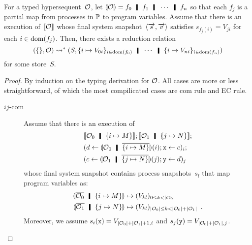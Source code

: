   \begin{proposition}
   \label{general-sound}
   For a typed hypersequent~$\mathcal{O}$, let $\semoi{\hypert} = f_0\hmid
   f_1\hmid\cdots \hmid f_n$ so that each $f_j$ is a partial map
   from processes in $\mathbb{P}$ to program variables.
   Assume that there is an execution of $\llbracket{\mathcal{O}}\rrbracket$ whose
   final system snapshot~$\langle{\overrightarrow s,\overrightarrow v}\rangle$ satisfies
   $s_{f_j(i)} = V_{ji}$ for each $i \in \mathop{\mathrm{dom}}(f_j)$.
   Then, there exists a reduction relation
   \[
   \concreteconf{\{\}}{\hypert}\reduction
   \concreteconf{S}{
   \{i\mapsto V_{0i}\}_{i\in\dom(f_0)}\hmid
   \cdots\hmid
   \{i\mapsto V_{ni}\}_{i\in\dom(f_n)}
   }
   \]
   for some store~$S$.
  \end{proposition}
   \begin{proof}
    By induction on the typing derivation for $\mathcal{O}$.
    All cases are more or less straightforward, of which the most
    compilicated cases are com rule and EC rule.
    \begin{description}
     \item[$ij$-com]
	  Assume that there is an execution of
	  \begin{align*}
	   &\semo{\hypert_0\hmid \imapsto{M}};
	   \semo{\hypert_1\hmid \jmapsto{N}};\\
	   &(d\leftarrow \semoi{\hypert_0\hmid\overline{\imapsto M}}(i); \p
	   x\leftarrow c)_i; \\
	   &(c\leftarrow \semoi{\hypert_1\hmid\overline{\jmapsto N}}(j); \p
	   y\leftarrow d)_j
	  \end{align*}
	  whose final system snapshot contains process snapshots~$s_l$
	  that map program variables as:
	  \begin{align*}
	   \semoi{\overline{\hypert_0}\hmid \imapsto{M}}&\mapsto
	   (V_{kl})_{0\le k < |\hypert_0|}\\
	   \semoi{\overline{\hypert_1}\hmid \jmapsto{N}}&\mapsto
	   (V_{kl})_{|\hypert_0|\le k < |\hypert_0| + |\hypert_1|}\enspace.
	  \end{align*}
	  Moreover, we assume $s_i(\texttt{x}) = V_{|\mathcal{O}_0|+|\mathcal{O}_1|+1,i}$
	  and $s_j(\texttt{y}) = V_{|\mathcal{O}_0| + |\mathcal{O}_1|,j}$.


\end{description}
\end{proof}
